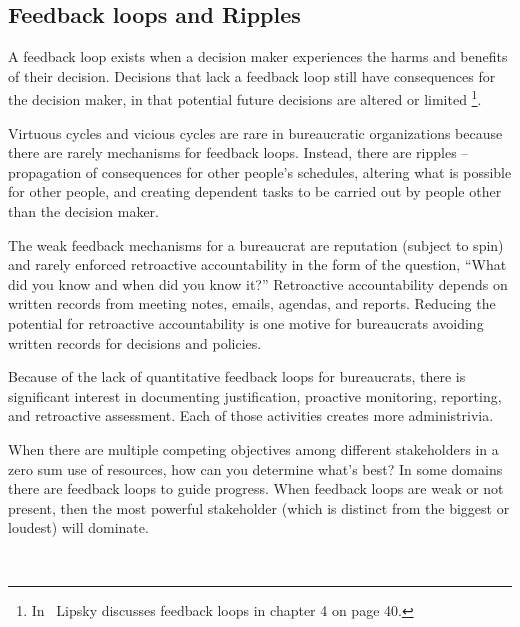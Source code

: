 \subsection*{Feedback loops and Ripples\label{sec:feedback-loop-and-ripples}}



A feedback loop exists when a decision maker experiences the harms and benefits of their decision. Decisions that lack a feedback loop still have consequences for the decision maker, in that potential future decisions are altered or limited \footnote{In~\cite{1983_Lipsky} Lipsky discusses feedback loops in chapter 4 on page 40.}.


Virtuous cycles and vicious cycles are rare in bureaucratic organizations because there are rarely mechanisms for feedback loops. Instead, there are \glspl{ripple} -- propagation of consequences for other people's schedules, altering what is possible for other people, and creating dependent tasks to be carried out by people other than the decision maker.


The weak feedback mechanisms for a bureaucrat are reputation (subject to spin)
and rarely enforced retroactive accountability in the form of the question, ``What did you know and when did you know it?''
Retroactive accountability depends on written records from meeting notes, emails, agendas, and reports. Reducing the potential for retroactive accountability is one motive for bureaucrats avoiding written records for decisions and policies.


Because of the lack of quantitative feedback loops for bureaucrats, there is significant interest in documenting justification, proactive monitoring, reporting, and retroactive assessment. Each of those activities creates more administrivia.


When there are multiple competing objectives among different stakeholders in a zero sum use of resources, how can you determine what's best? In some domains there are feedback loops to guide progress. When feedback loops are weak or not present, then the most powerful stakeholder (which is distinct from the biggest or loudest) will dominate. 


\ \\


